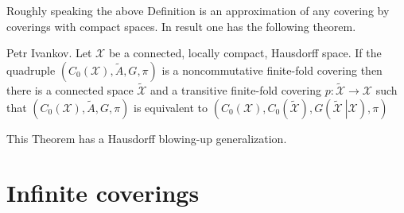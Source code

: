 \documentclass{beamer}
\theoremstyle{plain}
\newcommand{\sX}{\mathcal{X}}       %
\begin{document}
\begin{frame}
	Roughly speaking the above  Definition is an approximation of any covering by coverings with compact spaces.	
	In result one has the following theorem.
	\begin{theorem}
		\alert{Petr Ivankov}. 	Let $\mathcal X$ be a connected, locally compact, Hausdorff space.
		If the  quadruple $\left(C_0\left(\mathcal  X \right), \widetilde{A}, G,    \pi\right)$ is a noncommutative finite-fold covering then there is a connected space $\widetilde{   \mathcal X }$ and a transitive finite-fold covering  $p: \widetilde{   \mathcal X } \to \sX$ such that
		$\left(C_0\left(\mathcal  X \right), \widetilde{A}, G,    \pi\right)$ is equivalent to $\left(C_0\left( {   \mathcal X }\right), C_0\left( \widetilde{   \mathcal X }\right), G\left(\left. \widetilde{   \mathcal X } ~\right| {   \mathcal X }\right), \pi\right)$
	\end{theorem}
This Theorem has a Hausdorff blowing-up generalization.
\end{frame}

\section{Infinite coverings}
\end{document}
